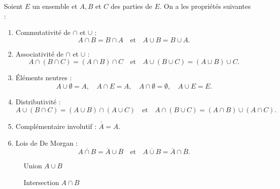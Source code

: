 \begin{prop}[Opérations]
    Soient $E$ un ensemble et $A, B$ et $C$ des parties de $E$. 
    On a les propriétés suivantes : 
    \begin{enumerate}
        \item Commutativité de $\cap$ et $\cup$ : 
            \[ A \cap B = B \cap A \quad \text{et} \quad A \cup B = B \cup A. \] 
        \item Associativité de $\cap$ et $\cup$ :
            \[ A \cap (B \cap C) = (A \cap B) \cap C \quad \text{et} \quad A \cup (B \cup C) = (A \cup B) \cup C. \] 
        \item Éléments neutres : 
            \[ A \cup \emptyset = A, \quad A \cap E = A, \quad A \cap \emptyset = \emptyset, \quad A \cup E = E. \] 
        \item Distributivité : 
            \[ A \cup (B \cap C) = (A \cup B) \cap (A \cup C) \quad \text{et} \quad A \cap (B \cup C) = (A \cap B) \cup (A \cap C). \] 
        \item Complémentaire involutif : $ \overline{\overline{A}} = A$. 
        \item Lois de De Morgan : 
            \[ \overline{A \cap B} = \overline{A} \cup \overline{B} \quad \text{et} \quad \overline{A \cup B} = \overline{A} \cap \overline{B}. \] 
    \end{enumerate}
\end{prop}



\begin{figure}[h!]
    \centering
    \begin{minipage}{0.45\linewidth}
        \centering
        \caption{Union $A \cup B$}
    \end{minipage}
    \hfill
    \begin{minipage}{0.45\linewidth}
        \centering
        \caption{Intersection $A \cap B$}
    \end{minipage}
\end{figure}

